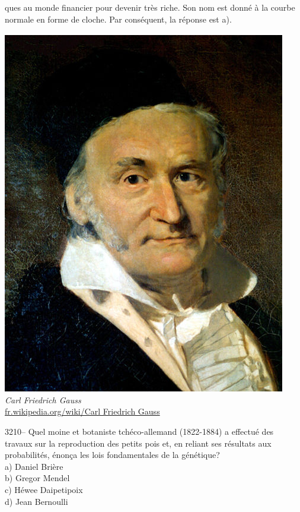 \documentclass[letterpaper, 12pt]{article}
\begin{document}
ques au monde financier pour devenir tr\`es riche. Son nom est donn\'e \`a la courbe normale en forme de cloche. Par cons\'equent, la r\'eponse est a).
\begin{center}
\includegraphics[scale=0.5]{Gauss.eps}\\
\emph{{\small Carl Friedrich Gauss}}\\
\href{http://fr.wikipedia.org/wiki/Carl_Friedrich_Gauss}{fr.wikipedia.org/wiki/Carl Friedrich Gauss}\\[5mm]
\end{center}



3210-- Quel moine et botaniste tch\'eco-allemand (1822-1884) a effectu\'e des travaux sur la reproduction des petits pois et, en reliant ses r\'esultats aux probabilit\'es, \'enon\c ca les lois fondamentales de la g\'en\'etique?\\

a) Daniel Bri\`ere\\
b) Gregor Mendel\\
c) H\'ewee Daipetipoix\\
d) Jean Bernoulli\\
\end{document}

